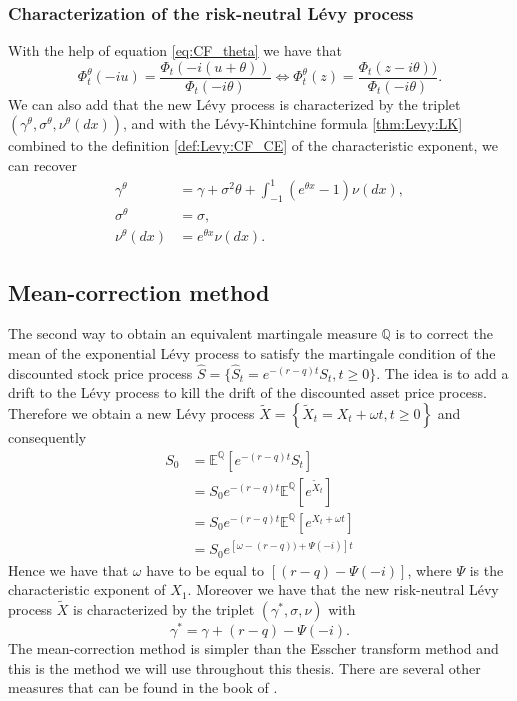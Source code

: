 \subsubsection*{Characterization of the risk-neutral L\'evy process}
With the help of equation \eqref{eq:CF_theta} we have that
$$\Phi_t^{\theta}(-iu) = \frac{\Phi_t(-i(u+\theta))}{\Phi_t(-i\theta)} \Longleftrightarrow \Phi_t^\theta(z)=\frac{\Phi_t(z-i\theta))}{\Phi_t(-i\theta)}.$$
We can also add that the new L\'evy process is characterized by the triplet $(\gamma^\theta,\sigma^\theta, \nu^\theta(dx))$, and with the L\'evy-Khintchine formula \ref{thm:Levy:LK} combined to the definition \eqref{def:Levy:CF_CE} of the characteristic exponent, we can recover
\begin{align*}
\gamma^\theta &= \gamma + \sigma^2 \theta + \int_{-1}^1 \left(e^{\theta x}-1\right)\nu(dx),\\
\sigma^\theta &= \sigma,\\
\nu^\theta(dx)&=e^{\theta x}\nu(dx).
\end{align*}

\subsection{Mean-correction method}
The second way to obtain an equivalent martingale measure $\mathbb{Q}$ is to correct the mean of the exponential L\'evy process to satisfy the martingale condition of the discounted stock price process $\hat{S}=\{\hat{S}_t=e^{-(r-q)t}S_t,t\geq0\}$. The idea is to add a drift to the L\'evy process to kill the drift of the discounted asset price process. Therefore we obtain a new L\'evy process $\tilde{X}=\left\{\tilde{X}_t=X_t+\omega t,t\geq0\right\}$ and consequently
\begin{align*}
S_0 &= \mathbb{E}^\mathbb{Q}\left[e^{-(r-q)t}S_t\right]\\
&= S_0e^{-(r-q)t} \mathbb{E}^\mathbb{Q}\left[e^{\tilde{X}_t}\right]\\
&=  S_0e^{-(r-q)t} \mathbb{E}^\mathbb{Q}\left[e^{X_t+\omega t}\right]\\
&= S_0e^{\left[\omega-(r-q)) + \Psi(-i)\right]t}
\end{align*}
Hence we have that $\omega$ have to be equal to $\left[(r-q)-\Psi(-i)\right]$, where $\Psi$ is the characteristic exponent of $X_1$. Moreover we have that the new risk-neutral L\'evy process $\tilde{X}$ is characterized by the triplet $(\gamma^\ast,\sigma,\nu)$ with
\begin{equation}\label{eq:rn_drift}
\gamma^\ast = \gamma + (r-q) - \Psi(-i).
\end{equation}
The mean-correction method is simpler than the Esscher transform method and this is the method we will use throughout this thesis. There are several other measures that can be found in the book of \citeauthor{Miy11} \citeyearpar{Miy11} \cite{Miy11}.
